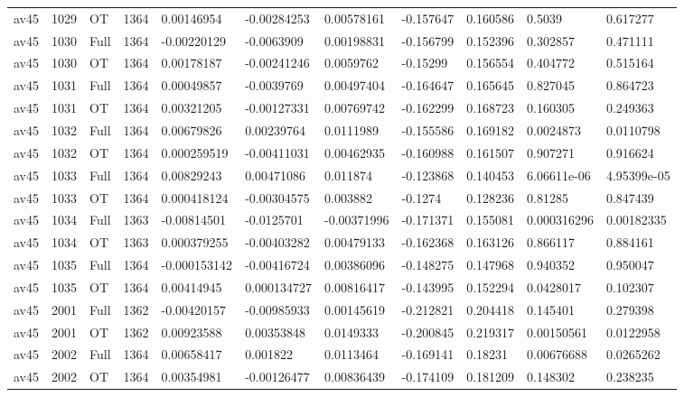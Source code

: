 \begin{landscape}
\begin{longtable}{lllllllllll}
av45 & 1029 & OT & 1364 & 0.00146954 & -0.00284253 & 0.00578161 & -0.157647 & 0.160586 & 0.5039 & 0.617277 \\
av45 & 1030 & Full & 1364 & -0.00220129 & -0.0063909 & 0.00198831 & -0.156799 & 0.152396 & 0.302857 & 0.471111 \\
av45 & 1030 & OT & 1364 & 0.00178187 & -0.00241246 & 0.0059762 & -0.15299 & 0.156554 & 0.404772 & 0.515164 \\
av45 & 1031 & Full & 1364 & 0.00049857 & -0.0039769 & 0.00497404 & -0.164647 & 0.165645 & 0.827045 & 0.864723 \\
av45 & 1031 & OT & 1364 & 0.00321205 & -0.00127331 & 0.00769742 & -0.162299 & 0.168723 & 0.160305 & 0.249363 \\
av45 & 1032 & Full & 1364 & 0.00679826 & 0.00239764 & 0.0111989 & -0.155586 & 0.169182 & 0.0024873 & 0.0110798 \\
av45 & 1032 & OT & 1364 & 0.000259519 & -0.00411031 & 0.00462935 & -0.160988 & 0.161507 & 0.907271 & 0.916624 \\
av45 & 1033 & Full & 1364 & 0.00829243 & 0.00471086 & 0.011874 & -0.123868 & 0.140453 & 6.06611e-06 & 4.95399e-05 \\
av45 & 1033 & OT & 1364 & 0.000418124 & -0.00304575 & 0.003882 & -0.1274 & 0.128236 & 0.81285 & 0.847439 \\
av45 & 1034 & Full & 1363 & -0.00814501 & -0.0125701 & -0.00371996 & -0.171371 & 0.155081 & 0.000316296 & 0.00182335 \\
av45 & 1034 & OT & 1363 & 0.000379255 & -0.00403282 & 0.00479133 & -0.162368 & 0.163126 & 0.866117 & 0.884161 \\
av45 & 1035 & Full & 1364 & -0.000153142 & -0.00416724 & 0.00386096 & -0.148275 & 0.147968 & 0.940352 & 0.950047 \\
av45 & 1035 & OT & 1364 & 0.00414945 & 0.000134727 & 0.00816417 & -0.143995 & 0.152294 & 0.0428017 & 0.102307 \\
av45 & 2001 & Full & 1362 & -0.00420157 & -0.00985933 & 0.00145619 & -0.212821 & 0.204418 & 0.145401 & 0.279398 \\
av45 & 2001 & OT & 1362 & 0.00923588 & 0.00353848 & 0.0149333 & -0.200845 & 0.219317 & 0.00150561 & 0.0122958 \\
av45 & 2002 & Full & 1364 & 0.00658417 & 0.001822 & 0.0113464 & -0.169141 & 0.18231 & 0.00676688 & 0.0265262 \\
av45 & 2002 & OT & 1364 & 0.00354981 & -0.00126477 & 0.00836439 & -0.174109 & 0.181209 & 0.148302 & 0.238235 \\

\end{longtable}
\end{landscape}
